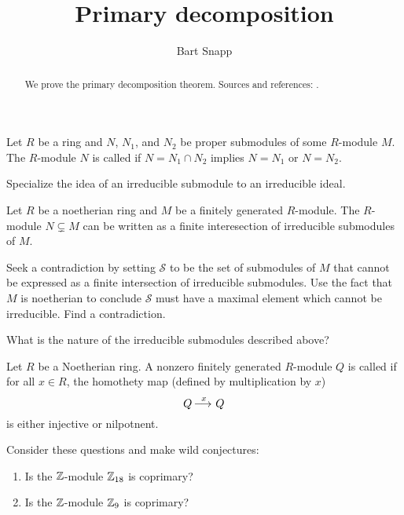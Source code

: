 \documentclass{ximera}
\author{Bart Snapp}
\title{Primary decomposition}
\begin{document}
\begin{abstract}
  We prove the primary decomposition theorem. Sources and references:
  \cite{AM1969, sD08, dE95, mR1995}.
\end{abstract}
\maketitle


\begin{definition}
  Let $R$ be a ring and $N$, $N_1$, and $N_2$ be proper submodules of
  some $R$-module $M$. The $R$-module $N$ is called 
  if $N = N_1\cap N_2$ implies $N=N_1$ or $N=N_2$.
\end{definition}


\begin{exercise}
  Specialize the idea of an irreducible submodule to an irreducible
  ideal.
\end{exercise}


\begin{lemma}
  Let $R$ be a noetherian ring and $M$ be a finitely generated
  $R$-module. The $R$-module $N\subsetneq M$ can be written as a finite
  interesection of irreducible submodules of $M$.
  \begin{sketch}
    Seek a contradiction by setting $\mathcal{S}$ to be the set of
    submodules of $M$ that cannot be expressed as a finite
    intersection of irreducible submodules. Use the fact that $M$ is
    noetherian to conclude $\mathcal{S}$ must have a maximal element
    which cannot be irreducible. Find a contradiction.
  \end{sketch}
\end{lemma}

\begin{question}
What is the nature of the irreducible submodules described above?
\end{question}


\begin{definition}
  Let $R$ be a Noetherian ring. A nonzero finitely generated
  $R$-module $Q$ is called  if for all $x\in R$, the
  homothety map (defined by multiplication by $x$)
  \[
  Q\mathop{\longrightarrow\,}\limits^x Q
  \]
  is either injective or nilpotnent.
\end{definition}

\begin{exercise}
  Consider these questions and make wild conjectures:
  \begin{enumerate}
  \item Is the $\mathbb Z$-module $\mathbb Z_{18}$ is coprimary?
  \item Is the $\mathbb Z$-module $\mathbb Z_{9}$ is coprimary?
  \end{enumerate}
\end{exercise}
\end{document}
